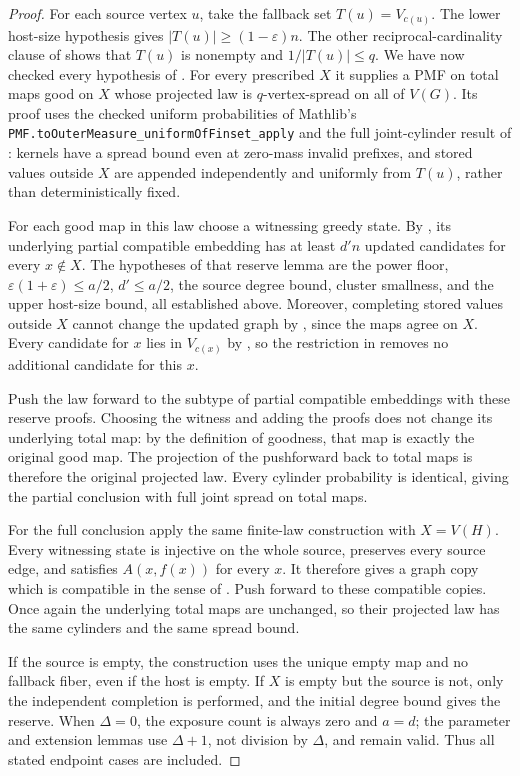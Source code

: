 \begin{proof}
For each source vertex $u$, take the fallback set $T(u)=V_{c(u)}$.
The lower host-size hypothesis gives
$|T(u)|\geq(1-\varepsilon)n$. The other reciprocal-cardinality
clause of  shows that $T(u)$
is nonempty and $1/|T(u)|\leq q$. We have now checked every
hypothesis of . For every prescribed
$X$ it supplies a PMF on total maps good on $X$ whose projected law
is $q$-vertex-spread on all of $V(G)$. Its proof uses the checked
uniform probabilities of Mathlib's \texttt{PMF.toOuterMeasure\_uniformOfFinset\_apply} and
the full joint-cylinder result of :
kernels have a spread bound even at zero-mass invalid prefixes, and
stored values outside $X$ are appended independently and uniformly
from $T(u)$, rather than deterministically fixed.

For each good map in this law choose a witnessing greedy state.
By , its underlying partial
compatible embedding has at least $d'n$ updated candidates for
every $x\notin X$. The hypotheses of that reserve lemma are the
power floor, $\varepsilon(1+\varepsilon)\leq a/2$, $d'\leq a/2$,
the source degree bound, cluster smallness, and the upper host-size
bound, all established above. Moreover, completing stored values
outside $X$ cannot change the updated graph by
, since the maps agree on $X$.
Every candidate for $x$ lies in $V_{c(x)}$ by
, so the restriction in
 removes no additional candidate
for this $x$.

Push the law forward to the subtype of partial compatible embeddings
with these reserve proofs. Choosing the witness and adding the
proofs does not change its underlying total map: by the definition
of goodness, that map is exactly the original good map. The
projection of the pushforward back to total maps is therefore the
original projected law. Every cylinder probability is identical,
giving the partial conclusion with full joint spread on total maps.

For the full conclusion apply the same finite-law construction with
$X=V(H)$. Every witnessing state is injective on the whole source,
preserves every source edge, and satisfies $A(x,f(x))$ for every $x$.
It therefore gives a graph copy which is compatible in the sense of
. Push forward to these compatible
copies. Once again the underlying total maps are unchanged, so
their projected law has the same cylinders and the same spread bound.

If the source is empty, the construction uses the unique empty map
and no fallback fiber, even if the host is empty. If $X$ is empty
but the source is not, only the independent completion is performed,
and the initial degree bound gives the reserve. When $\Delta=0$,
the exposure count is always zero and $a=d$; the parameter and
extension lemmas use $\Delta+1$, not division by $\Delta$, and
remain valid. Thus all stated endpoint cases are included.
\end{proof}
